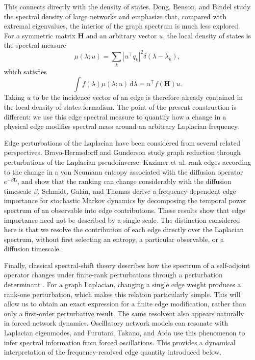 \documentclass[11pt,reqno]{amsart}
\newcommand{\dd}{\,\mathrm d}
\begin{document}
This connects directly with the density of states. Dong, Benson, and Bindel \cite{dong2019dos} study the spectral density of large networks and emphasize that, compared with extremal eigenvalues, the interior of the graph spectrum is much less explored. For a symmetric matrix $\mathbf{H}$ and an arbitrary vector $u$, the local density of states is the spectral measure
\begin{equation}
\mu(\lambda;u)
=\sum_k |u^\intercal q_k|^2\delta(\lambda-\lambda_k),
\end{equation}
which satisfies
\begin{equation}
\int f(\lambda)\mu(\lambda;u)\dd\lambda
=u^\intercal f(\mathbf{H})u.
\end{equation}
Taking $u$ to be the incidence vector of an edge is therefore already contained in the local-density-of-states formalism. The point of the present construction is different: we use this edge spectral measure to quantify how a change in a physical edge modifies spectral mass around an arbitrary Laplacian frequency.

Edge perturbations of the Laplacian have been considered from several related perspectives. Bravo-Hermsdorff and Gunderson \cite{bravo2019unifying} study graph reduction through perturbations of the Laplacian pseudoinverse. Kazimer et al. \cite{kazimer2024ranking} rank edges according to the change in a von Neumann entropy associated with the diffusion operator $e^{-\beta\mathbf{L}}$, and show that the ranking can change considerably with the diffusion timescale $\beta$. Schmidt, Gal\'an, and Thomas \cite{schmidt2018stochastic} derive a frequency-dependent edge importance for stochastic Markov dynamics by decomposing the temporal power spectrum of an observable into edge contributions. These results show that edge importance need not be described by a single scale. The distinction considered here is that we resolve the contribution of each edge directly over the Laplacian spectrum, without first selecting an entropy, a particular observable, or a diffusion timescale.

Finally, classical spectral-shift theory describes how the spectrum of a self-adjoint operator changes under finite-rank perturbations through a perturbation determinant \cite{behrndt2018spectral}. For a graph Laplacian, changing a single edge weight produces a rank-one perturbation, which makes this relation particularly simple. This will allow us to obtain an exact expression for a finite edge modification, rather than only a first-order perturbative result. The same resolvent also appears naturally in forced network dynamics. Oscillatory network models can resonate with Laplacian eigenmodes, and Furutani, Takano, and Aida \cite{furutani2019resonance} use this phenomenon to infer spectral information from forced oscillations. This provides a dynamical interpretation of the frequency-resolved edge quantity introduced below.
\end{document}

